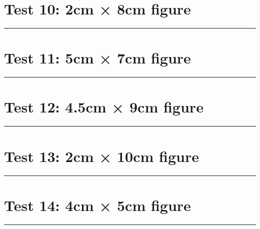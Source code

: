 \documentclass[a4paper,11pt]{article}
\begin{document}
\section*{Test 10: 2cm × 8cm figure}
\begin{swarmwrap}%
  \begin{minipage}[t]{2cm}
    \centering
    \rule{\linewidth}{8cm}
  \end{minipage}%
\end{swarmwrap}%
\swarmwrapnext
\lipsum[93]
\lipsum[94]
\lipsum[95]
\section*{Test 11: 5cm × 7cm figure}
\begin{swarmwrap}%
  \begin{minipage}[t]{5cm}
    \centering
    \rule{\linewidth}{7cm}
  \end{minipage}%
\end{swarmwrap}%
\swarmwrapnext
\lipsum[13]
\lipsum[14]
\lipsum[15]
\lipsum[16]
\lipsum[17]
\section*{Test 12: 4.5cm × 9cm figure}
\begin{swarmwrap}%
  \begin{minipage}[t]{4cm}
    \centering
    \rule{\linewidth}{9cm}
  \end{minipage}%
\end{swarmwrap}%
\swarmwrapnext
\lipsum[98]
\lipsum[99]
\lipsum[100]
\section*{Test 13: 2cm × 10cm figure}
\begin{swarmwrap}%
  \begin{minipage}[t]{2cm}
    \centering
    \rule{\linewidth}{10cm}
  \end{minipage}%
\end{swarmwrap}%
\swarmwrapnext
\lipsum[94]
\lipsum[95]
\lipsum[96]
\lipsum[97]
\lipsum[98]
\section*{Test 14: 4cm × 5cm figure}
\begin{swarmwrap}%
  \begin{minipage}[t]{4cm}
    \centering
    \rule{\linewidth}{5cm}
  \end{minipage}%
\end{swarmwrap}%
\swarmwrapnext
\lipsum[13]
\lipsum[14]
\lipsum[15]
\end{document}
